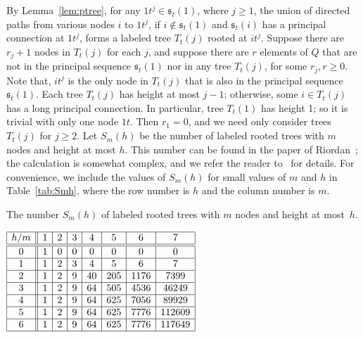 \documentclass{llncs}
\renewcommand{\ge}{\geqslant}
\newcommand{\seq}{{\mathfrak{s}}}
\begin{document}
By Lemma~\ref{lem:ptree}, for any $1t^j \in \seq_t(1)$, where $j \ge 1$, the union of directed paths from various nodes $i$ to $1t^j$, if $i \not\in \seq_t(1)$ and $\seq_t(i)$ has a principal connection at $1t^j$, forms a labeled tree $T_t(j)$ rooted at $it^j$. Suppose there are $r_j+1$ nodes in $T_t(j)$ for each $j$, and suppose there are $r$ elements of $Q$ that are not in the principal sequence $\seq_t(1)$ nor in any tree $T_t(j)$, for some $r_j,r \ge 0$. Note that, $it^j$ is the only node in $T_t(j)$ that is also in the principal sequence $\seq_t(1)$. Each tree $T_t(j)$ has height at most $j-1$; otherwise, some $i \in T_t(j)$ has a long principal connection. In particular, tree $T_t(1)$ has height 1; so it is trivial with only one node $1t$. Then $r_1 = 0$, and we need only consider trees $T_t(j)$ for $j \ge 2$. Let $S_m(h)$ be the number of labeled rooted trees with $m$ nodes and height at most $h$. This number can be found in the paper of Riordan~\cite{Rio60}; the calculation is somewhat complex, and we refer the reader to~\cite{Rio60} for details. For convenience, we include the values of $S_m(h)$ for small values of $m$ and $h$ in Table~\ref{tab:Smh}, where the row number is $h$ and the column number is $m$. 


\begin{table}[ht]
\caption{The number $S_m(h)$ of labeled rooted trees with $m$ nodes and height at most~$h$.}
\label{tab:Smh}
\begin{center}
$
\begin{array}{|c||c|c|c|c|c|c|c|}    
\hline
 h/m & 1 & 2 & 3 & 4 & 5 & 6 & 7 \\
\hline \hline

 0   & 1 & 0 & 0 & 0 & 0 & 0 & 0 \\
\hline 

 1   & 1 & 2 & 3 & 4 & 5 & 6 & 7 \\
\hline 

 2   & 1 & 2 & 9 & 40 & 205 & 1176 & 7399 \\
\hline 

 3   & 1 & 2 & 9 & 64 & 505 & 4536 & 46249\\
\hline 

 4   & 1 & 2 & 9 & 64 & 625 & 7056 & 89929 \\
\hline 

 5   & 1 & 2 & 9 & 64 & 625 & 7776 & 112609 \\
\hline 

 6   & 1 & 2 & 9 & 64 & 625 & 7776 & 117649 \\

\hline
\end{array}
$
\end{center}
\label{table0}
\end{table}
\end{document}

